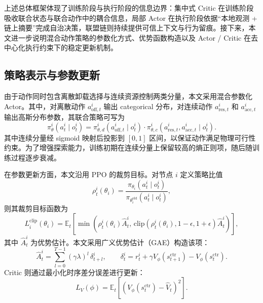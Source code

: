 上述总体框架体现了训练阶段与执行阶段的信息边界：集中式 Critic 在训练阶段吸收联合状态与联合动作中的耦合信息，局部 Actor 在执行阶段依据“本地观测 + 链上摘要”完成自治决策，联盟链则持续提供可信上下文与行为留痕。接下来，本文进一步说明混合动作策略的参数化方式、优势函数构造以及 Actor / Critic 在去中心化执行约束下的稳定更新机制。

\subsection{策略表示与参数更新}

由于动作同时包含离散卸载选择与连续资源控制两类分量，本文采用混合参数化 Actor。其中，对离散动作 $a_{\mathrm{off},t}^i$ 输出 categorical 分布，对连续动作 $a_{\mathrm{res},t}^i$ 和 $a_{\mathrm{acc},t}^i$ 输出高斯分布参数，其联合策略可写为
\begin{equation}
    \pi_\theta^i(a_t^i\mid o_t^i)=\pi_{\theta,d}^i(a_{\mathrm{off},t}^i\mid o_t^i)\cdot\pi_{\theta,c}^i(a_{\mathrm{res},t}^i,a_{\mathrm{acc},t}^i\mid o_t^i).
    \label{eq:ch4_hybrid_policy}
\end{equation}
其中连续分量经 sigmoid 映射后投影到 $[0,1]$ 区间，以保证动作满足物理可行性约束。为了增强探索能力，训练初期在连续分量上保留较高的熵正则项，随后随训练过程逐步衰减。

在参数更新方面，本文沿用 PPO 的裁剪目标\cite{Schulman2017,Yu2022MAPPO}。对节点 $i$ 定义策略比值
\begin{equation}
    \rho_t^i(\theta_i)=\frac{\pi_{\theta_i}(a_t^i\mid o_t^i)}{\pi_{\theta_i^{\mathrm{old}}}(a_t^i\mid o_t^i)},
    \label{eq:ch4_ratio}
\end{equation}
则其裁剪目标函数为
\begin{equation}
    L_i^{\mathrm{clip}}(\theta_i)=\mathbb{E}_t\!\left[\min\!\left(\rho_t^i(\theta_i)\hat{A}_t^i,\,
    \mathrm{clip}(\rho_t^i(\theta_i),1-\epsilon,1+\epsilon)\hat{A}_t^i\right)\right],
    \label{eq:ch4_ppo_clip}
\end{equation}
其中 $\hat{A}_t^i$ 为优势估计。本文采用广义优势估计（GAE）构造该项：
\begin{equation}
    \hat{A}_t^i=\sum_{l=0}^{T-1}(\gamma\lambda)^l\,\delta_{t+l}^i,\qquad
    \delta_t^i=r_t^i+\gamma V_\phi\!\left(s_{t+1}^{\mathrm{ctr}}\right)-V_\phi\!\left(s_t^{\mathrm{ctr}}\right).
    \label{eq:ch4_gae}
\end{equation}
Critic 则通过最小化时序差分误差进行更新：
\begin{equation}
    L_V(\phi)=\mathbb{E}_t\!\left[\left(V_\phi\!\left(s_t^{\mathrm{ctr}}\right)-\hat{V}_t\right)^2\right].
    \label{eq:ch4_value_loss}
\end{equation}

